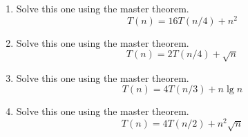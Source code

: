 \documentclass{article}
\begin{document}
\begin{enumerate}
    \item Solve this one using the master theorem.
      \[T(n) = 16T(n/4) + n^2\]
    
      
    \item Solve this one using the master theorem.
      \[T(n) = 2T(n/4) + \sqrt{n}\]
    
    \item Solve this one using the master theorem.
      \[T(n) = 4T(n/3) + n\lg n\]
    
    \item Solve this one using the master theorem.
      \[T(n) = 4T(n/2) + n^2\sqrt{n}\]
    
    \end{enumerate}
    
    
\end{document}
